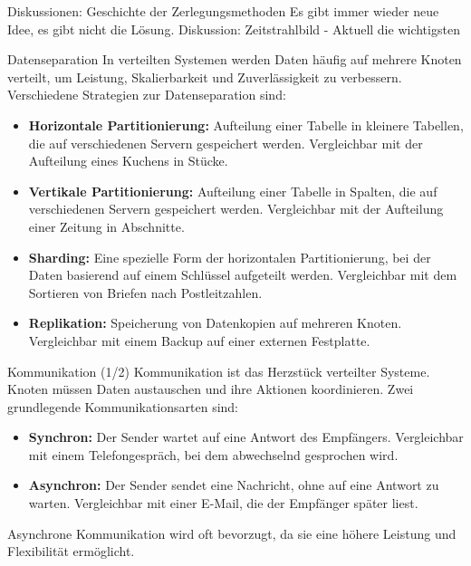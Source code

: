 \documentclass{beamer}
\begin{document}
\begin{frame}{Diskussionen: Geschichte der Zerlegungsmethoden}
    Es gibt immer wieder neue Idee, es gibt nicht die Lösung.
    Diskussion: Zeitstrahlbild - Aktuell die wichtigsten
\end{frame}


\begin{frame}{Datenseparation}
    In verteilten Systemen werden Daten häufig auf mehrere Knoten verteilt, um Leistung, Skalierbarkeit und Zuverlässigkeit zu verbessern. Verschiedene Strategien zur Datenseparation sind:
    \begin{itemize}
        \item \textbf{Horizontale Partitionierung:} Aufteilung einer Tabelle in kleinere Tabellen, die auf verschiedenen Servern gespeichert werden. Vergleichbar mit der Aufteilung eines Kuchens in Stücke.
        \item \textbf{Vertikale Partitionierung:} Aufteilung einer Tabelle in Spalten, die auf verschiedenen Servern gespeichert werden. Vergleichbar mit der Aufteilung einer Zeitung in Abschnitte.
        \item \textbf{Sharding:} Eine spezielle Form der horizontalen Partitionierung, bei der Daten basierend auf einem Schlüssel aufgeteilt werden. Vergleichbar mit dem Sortieren von Briefen nach Postleitzahlen.
        \item \textbf{Replikation:} Speicherung von Datenkopien auf mehreren Knoten. Vergleichbar mit einem Backup auf einer externen Festplatte.
    \end{itemize}
\end{frame}

\begin{frame}{Kommunikation (1/2)}
    Kommunikation ist das Herzstück verteilter Systeme. Knoten müssen Daten austauschen und ihre Aktionen koordinieren. Zwei grundlegende Kommunikationsarten sind:
    \begin{itemize}
        \item \textbf{Synchron:} Der Sender wartet auf eine Antwort des Empfängers. Vergleichbar mit einem Telefongespräch, bei dem abwechselnd gesprochen wird.
        \item \textbf{Asynchron:} Der Sender sendet eine Nachricht, ohne auf eine Antwort zu warten. Vergleichbar mit einer E-Mail, die der Empfänger später liest.
    \end{itemize}
    Asynchrone Kommunikation wird oft bevorzugt, da sie eine höhere Leistung und Flexibilität ermöglicht.
\end{frame}
\end{document}
